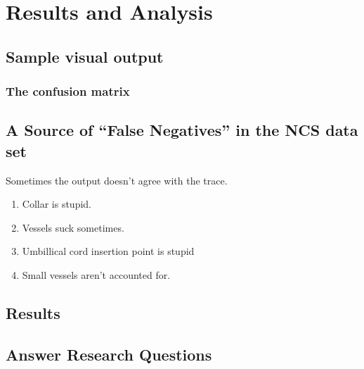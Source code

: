 
\chapter{Results and Analysis}

\section{Sample visual output}
\subsection{The confusion matrix}
\section{A Source of ``False Negatives'' in the NCS data set} \label{sec:NCS-dataset-issues}

Sometimes the output doesn't agree with the trace.
\begin{enumerate}
\item Collar is stupid.
\item Vessels suck sometimes.
\item Umbillical cord insertion point is stupid
\item Small vessels aren't accounted for.
\end{enumerate}


\section{Results}


\section{Answer Research Questions}